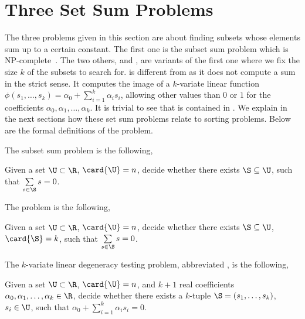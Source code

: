
\section{Three Set Sum Problems}

The three problems given in this section are about finding subsets whose
elements sum up to a certain constant. The first one is the subset sum problem
which is NP-complete~\cite{karp:1972}. The two others, \kSUM and \kLDT, are
variants of the first one where we fix the size $k$ of the subsets to search
for. \kLDT is different from \kSUM as it does not compute a sum in the
strict sense.  It computes the image of a $k$-variate linear function
$\phi(s_1, \ldots, s_k) = \alpha_0 + \sum_{i=1}^{k} \alpha_i s_i$, allowing
other values than $0$ or $1$ for the coefficients $\alpha_0, \alpha_1, \ldots,
\alpha_k$. It is trivial to see that \kSUM is contained in \kLDT. We
explain in the next sections how these set sum problems relate to sorting
problems. Below are the formal definitions of the problem.

The subset sum problem is the following,

\begin{problem}
Given a set $\U \subset \R$, $\card{\U} = n$, decide whether there exists
$\S \subseteq \U$, such that $\sum\limits_{s \in \S} s = 0$.
\end{problem}


The \kSUM problem is the following,

\begin{problem}
Given a set $\U \subset \R$, $\card{\U} = n$, decide whether there exists
$\S \subseteq \U$, $\card{\S} = k$, such that $\sum\limits_{s
\in \S} s = 0$.
\end{problem}


The $k$-variate linear degeneracy testing problem, abbreviated \kLDT, is the
following,

\begin{problem}
Given a set $\U \subset \R$, $\card{\U} = n$, and $k+1$ real
coefficients $\alpha_0, \alpha_1, \ldots, \alpha_k \in \R$, decide whether
there exists a $k$-tuple
$\S = (s_1, \ldots, s_k)$, $s_i \in \U$, such that
$\alpha_0 + \sum_{i=1}^{k} \alpha_i s_i = 0$.
\end{problem}
